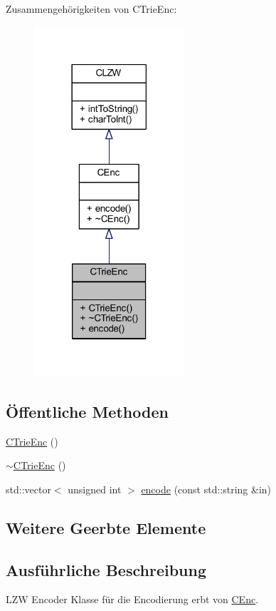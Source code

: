 Zusammengehörigkeiten von C\+Trie\+Enc\+:
\nopagebreak
\begin{figure}[H]
\begin{center}
\leavevmode
\includegraphics[width=158pt]{class_c_trie_enc__coll__graph}
\end{center}
\end{figure}
\subsection*{Öffentliche Methoden}
\begin{DoxyCompactItemize}
\item 
\hyperlink{class_c_trie_enc_ace11a48f0a8dab419a410b61cb58cfdc}{C\+Trie\+Enc} ()
\item 
\hyperlink{class_c_trie_enc_a6627940420ef4052bd8d395db959b562}{$\sim$\+C\+Trie\+Enc} ()
\item 
std\+::vector$<$ unsigned int $>$ \hyperlink{class_c_trie_enc_a14832d9694f7aa5ba9d7d32d3a3c0793}{encode} (const std\+::string \&in)
\end{DoxyCompactItemize}
\subsection*{Weitere Geerbte Elemente}


\subsection{Ausführliche Beschreibung}
L\+ZW Encoder Klasse für die Encodierung erbt von \hyperlink{class_c_enc}{C\+Enc}. 

